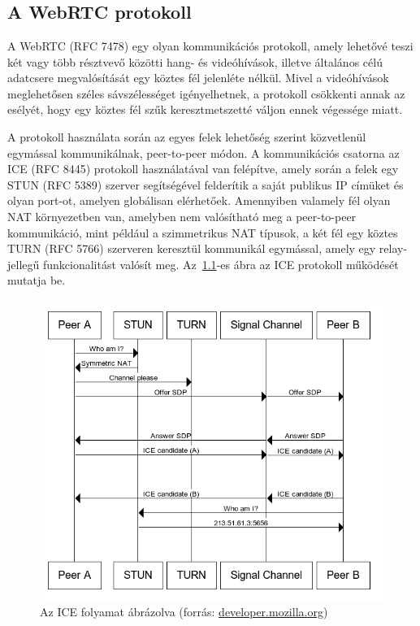 \chapter{\bevezetes}\label{ch:bevezetes}


\section{A WebRTC protokoll}\label{sec:a-webrtc-protokoll}

A WebRTC (RFC 7478\cite{RFC_7478}) egy olyan kommunikációs protokoll, amely lehetővé teszi két vagy több résztvevő közötti hang- és
videóhívások, illetve általános célú adatcsere megvalósítását egy köztes fél jelenléte nélkül.
Mivel a videóhívások meglehetősen széles sávszélességet igényelhetnek, a protokoll csökkenti annak az esélyét,
hogy egy köztes fél szűk keresztmetszetté váljon ennek végessége miatt.

A protokoll használata során az egyes felek lehetőség szerint közvetlenül egymással kommunikálnak, peer-to-peer módon.
A kommunikációs csatorna az ICE (RFC 8445\cite{ICE}) protokoll használatával van felépítve, amely során a felek egy STUN (RFC 5389)
szerver segítségével felderítik a saját publikus IP címüket és olyan port-ot, amelyen globálisan elérhetőek.
Amennyiben valamely fél olyan NAT környezetben van, amelyben nem valósítható meg a peer-to-peer kommunikáció, mint például
a szimmetrikus NAT típusok, a két fél egy köztes TURN (RFC 5766\cite{TURN}) szerveren keresztül kommunikál egymással, amely egy
relay-jellegű funkcionalitást valósít meg.
Az~\ref{fig:ice}-es ábra az ICE protokoll működését mutatja be.

\begin{figure}[!ht]
    \centering
    \includegraphics[width=150mm, keepaspectratio]{figures/ice}
    \caption{Az ICE folyamat ábrázolva (forrás: \href{https://developer.mozilla.org/en-US/docs/Web/API/WebRTC_API/Connectivity}{developer.mozilla.org})}
    \label{fig:ice}
\end{figure}

